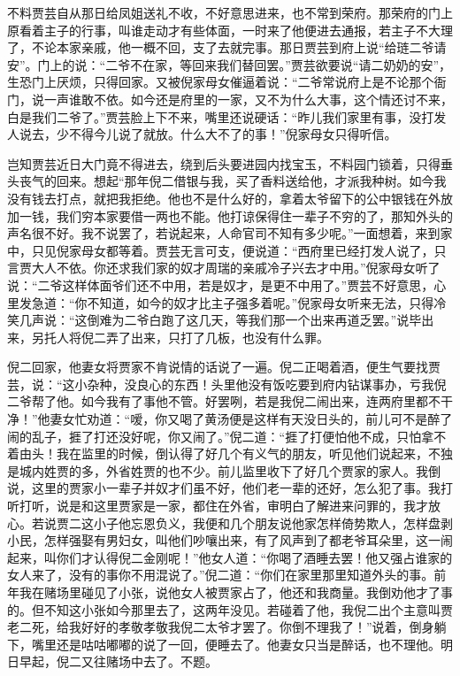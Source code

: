 \begin{parag}
    不料贾芸自从那日给凤姐送礼不收，不好意思进来，也不常到荣府。那荣府的门上原看着主子的行事，叫谁走动才有些体面，一时来了他便进去通报，若主子不大理了，不论本家亲戚，他一概不回，支了去就完事。那日贾芸到府上说“给琏二爷请安”。门上的说：“二爷不在家，等回来我们替回罢。”贾芸欲要说“请二奶奶的安”，生恐门上厌烦，只得回家。又被倪家母女催逼着说：“二爷常说府上是不论那个衙门，说一声谁敢不依。如今还是府里的一家，又不为什么大事，这个情还讨不来，白是我们二爷了。”贾芸脸上下不来，嘴里还说硬话：“昨儿我们家里有事，没打发人说去，少不得今儿说了就放。什么大不了的事！”倪家母女只得听信。
\end{parag}


\begin{parag}
    岂知贾芸近日大门竟不得进去，绕到后头要进园内找宝玉，不料园门锁着，只得垂头丧气的回来。想起“那年倪二借银与我，买了香料送给他，才派我种树。如今我没有钱去打点，就把我拒绝。他也不是什么好的，拿着太爷留下的公中银钱在外放加一钱，我们穷本家要借一两也不能。他打谅保得住一辈子不穷的了，那知外头的声名很不好。我不说罢了，若说起来，人命官司不知有多少呢。”一面想着，来到家中，只见倪家母女都等着。贾芸无言可支，便说道：“西府里已经打发人说了，只言贾大人不依。你还求我们家的奴才周瑞的亲戚冷子兴去才中用。”倪家母女听了说：“二爷这样体面爷们还不中用，若是奴才，是更不中用了。”贾芸不好意思，心里发急道：“你不知道，如今的奴才比主子强多着呢。”倪家母女听来无法，只得冷笑几声说：“这倒难为二爷白跑了这几天，等我们那一个出来再道乏罢。”说毕出来，另托人将倪二弄了出来，只打了几板，也没有什么罪。
\end{parag}


\begin{parag}
    倪二回家，他妻女将贾家不肯说情的话说了一遍。倪二正喝着酒，便生气要找贾芸，说：“这小杂种，没良心的东西！头里他没有饭吃要到府内钻谋事办，亏我倪二爷帮了他。如今我有了事他不管。好罢咧，若是我倪二闹出来，连两府里都不干净！”他妻女忙劝道：“嗳，你又喝了黄汤便是这样有天没日头的，前儿可不是醉了闹的乱子，捱了打还没好呢，你又闹了。”倪二道：“捱了打便怕他不成，只怕拿不着由头！我在监里的时候，倒认得了好几个有义气的朋友，听见他们说起来，不独是城内姓贾的多，外省姓贾的也不少。前儿监里收下了好几个贾家的家人。我倒说，这里的贾家小一辈子并奴才们虽不好，他们老一辈的还好，怎么犯了事。我打听打听，说是和这里贾家是一家，都住在外省，审明白了解进来问罪的，我才放心。若说贾二这小子他忘恩负义，我便和几个朋友说他家怎样倚势欺人，怎样盘剥小民，怎样强娶有男妇女，叫他们吵嚷出来，有了风声到了都老爷耳朵里，这一闹起来，叫你们才认得倪二金刚呢！”他女人道：“你喝了酒睡去罢！他又强占谁家的女人来了，没有的事你不用混说了。”倪二道：“你们在家里那里知道外头的事。前年我在赌场里碰见了小张，说他女人被贾家占了，他还和我商量。我倒劝他才了事的。但不知这小张如今那里去了，这两年没见。若碰着了他，我倪二出个主意叫贾老二死，给我好好的孝敬孝敬我倪二太爷才罢了。你倒不理我了！”说着，倒身躺下，嘴里还是咕咕嘟嘟的说了一回，便睡去了。他妻女只当是醉话，也不理他。明日早起，倪二又往赌场中去了。不题。
\end{parag}


